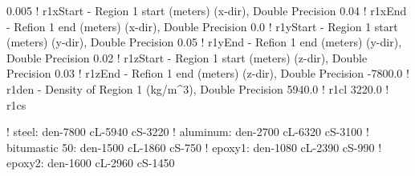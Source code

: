 0.005        ! r1xStart - Region 1 start (meters) (x-dir), Double Precision
0.04        ! r1xEnd - Refion 1 end (meters) (x-dir), Double Precision
0.0         ! r1yStart - Region 1 start (meters) (y-dir), Double Precision
0.05         ! r1yEnd - Refion 1 end (meters) (y-dir), Double Precision
0.02         ! r1zStart - Region 1 start (meters) (z-dir), Double Precision
0.03      ! r1zEnd - Refion 1 end (meters) (z-dir), Double Precision
-7800.0      ! r1den - Density of Region 1 (kg/m^3), Double Precision
5940.0	    ! r1cl
3220.0      ! r1cs

!  steel: den-7800 cL-5940 cS-3220
!  aluminum: den-2700 cL-6320 cS-3100
!  bitumastic 50: den-1500 cL-1860 cS-750
!  epoxy1: den-1080 cL-2390 cS-990
!  epoxy2: den-1600 cL-2960 cS-1450